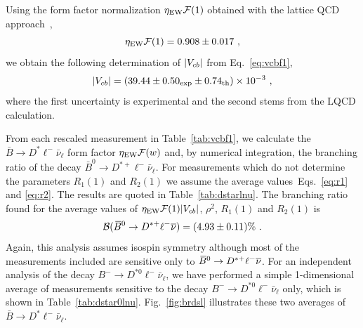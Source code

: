 Using the form factor normalization $\eta_\mathrm{EW}{\cal F}(1)$
obtained with the lattice QCD approach~\cite{Bailey:2010gb},
\begin{equation}
  \eta_\mathrm{EW}{\cal F}(1) = 0.908\pm 0.017~,
\end{equation}
we obtain the following determination of $|V_{cb}|$ from
Eq.~\ref{eq:vcbf1},
\begin{equation}
  |V_{cb}| = (39.44\pm 0.50_{\rm exp}\pm 0.74_{\rm th})\times
  10^{-3}~, \label{eq:vcbdstar}
\end{equation}
where the first uncertainty is experimental and the second stems from
the LQCD calculation.

From each rescaled measurement in Table~\ref{tab:vcbf1}, we
calculate the $\bar B\to D^*\ell^-\bar\nu_\ell$ form factor
$\eta_\mathrm{EW}{\cal F}(w)$ and, by numerical integration, the
branching ratio of the decay $\bar B^0\to
D^{*+}\ell^-\bar\nu_\ell$. For measurements which do not determine the
parameters $R_1(1)$ and $R_2(1)$ we assume the average
values~Eqs.~\ref{eq:r1} and \ref{eq:r2}. The results are quoted in
Table~\ref{tab:dstarlnu}. The branching ratio found for the average
values of $\eta_\mathrm{EW}{\cal F}(1)|V_{cb}|$, $\rho^2$, $R_1(1)$ and
$R_2(1)$ is
\begin{equation}
  {\cal B}(\kern 0.18em\overline{\kern -0.18em B}{}^0 \to D^{*+}\ell^{-}\overline{\nu})=(4.93\pm 0.11)\%~.
\end{equation}
Again, this analysis assumes isospin symmetry although most of the
measurements included are sensitive only to $\kern 0.18em\overline{\kern -0.18em B}{}^0 \to D^{*+}\ell^{-}\overline{\nu}$. For an
independent analysis of the decay $B^-\to D^{*0}\ell^-\bar\nu_\ell$,
we have performed a simple 1-dimensional average of measurements
sensitive to the decay $B^-\to D^{*0}\ell^-\bar\nu_\ell$ only, which is
shown in Table~\ref{tab:dstar0lnu}. Fig.~\ref{fig:brdsl} illustrates
these two averages of $\bar B\to D^*\ell^-\bar\nu_\ell$.


